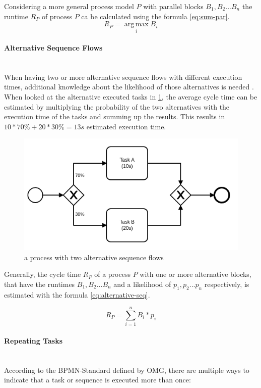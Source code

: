 Considering a more general process model $P$ with parallel blocks $B_1,B_2 ... B_n$ the runtime $R_P$ of process $P$ ca be calculated using the formula \ref{eq:sum-par}. 
\begin{equation}\label{eq:sum-par}
	R_P = \operatorname*{arg\,max}_i B_i
\end{equation}

\paragraph{Alternative Sequence Flows}~\\
When having two or more alternative sequence flows with different execution times, additional knowledge about the likelihood of those alternatives is needed \cite{fundamentals}. When looked at the alternative executed tasks in \ref{fig:alternative-tasks}, the average cycle time can be estimated by multiplying the probability of the two alternatives with the execution time of the tasks and summing up the results. This results in $10 * 70\% + 20 * 30\% = 13s$ estimated execution time. 

\begin{figure}[H]
	\centering
	\includegraphics[width=0.5\columnwidth]{graphics/alternative-tasks}
	\caption{a process with two alternative sequence flows} 
	\label{fig:alternative-tasks} 
\end{figure}

Generally, the cycle time $R_P$ of a process $P$ with one or more alternative blocks, that have the runtimes $B_1,B_2 ... B_n$ and a likelihood of $p_1,p_2 ... p_n$ respectively, is estimated with the formula \ref{eq:alternative-seq}. \cite{fundamentals}

\begin{equation}\label{eq:alternative-seq}
	R_P = \displaystyle\sum_{i=1}^{n} B_i * p_i
\end{equation}

\paragraph{Repeating Tasks}~\\
According to the BPMN-Standard\cite{bpmnstandard} defined by OMG, there are multiple ways to indicate that a task or sequence is executed more than once: 

